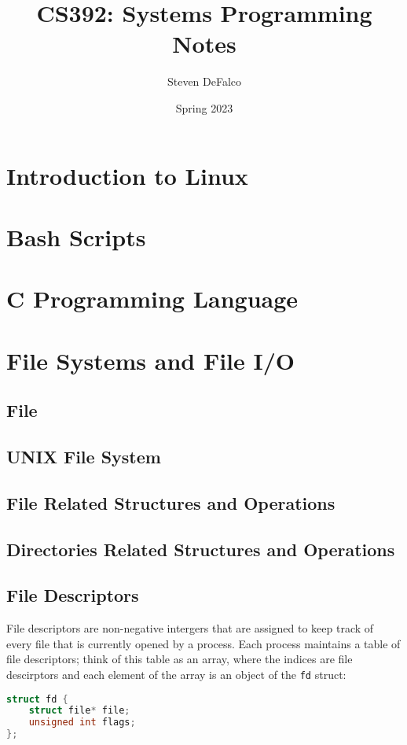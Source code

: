 \documentclass{article}
\title{CS392: Systems Programming Notes}
\author{Steven DeFalco}
\date{Spring 2023}
\newcommand{\code}[1]{\texttt{#1}}
\begin{document}
\maketitle
\tableofcontents
\newpage


\section{Introduction to Linux}
\section{Bash Scripts}
\section{C Programming Language}

\newpage
\section{File Systems and File I/O}

\subsection{File}
\subsection{UNIX File System}
\subsection{File Related Structures and Operations}
\subsection{Directories Related Structures and Operations}

\subsection{File Descriptors}

File descriptors are non-negative intergers that are assigned to keep track of every file that is currently opened by a process. Each process maintains a table of file descriptors; think of this table as an array, where the indices are file descirptors and each element of the array is an object of the \code{fd} struct: 

\begin{lstlisting}[language=C]
struct fd {
    struct file* file;
    unsigned int flags;
};
\end{lstlisting} 
\end{document}
